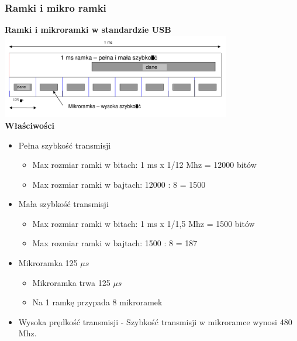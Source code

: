 		\subsubsection{Ramki i mikro ramki}
			\textbf{Ramki i mikroramki w standardzie USB}\\
			\includegraphics[width=10cm]{./wyklady/USB_11_1.pdf}\\
			\textbf{Właściwości}
			\begin{itemize}
				\item Pełna szybkość transmisji
				\begin{itemize}
					\item Max rozmiar ramki w bitach: 1 ms x 1/12 Mhz = 12000 bitów
					\item Max rozmiar ramki w bajtach: 12000 : 8 = 1500
				\end{itemize}
				\item Mała szybkość transmisji
				\begin{itemize}
					\item Max rozmiar ramki w bitach: 1 ms x 1/1,5 Mhz = 1500 bitów
					\item Max rozmiar ramki w bajtach: 1500 : 8 = 187
				\end{itemize}
				\item Mikroramka 125 $\mu s$
				\begin{itemize}
					\item Mikroramka trwa 125 $\mu s$
					\item Na 1 ramkę przypada 8 mikroramek
				\end{itemize}
				\item Wysoka prędkość transmisji - Szybkość transmisji w mikroramce wynosi 480 Mhz.
			\end{itemize}
